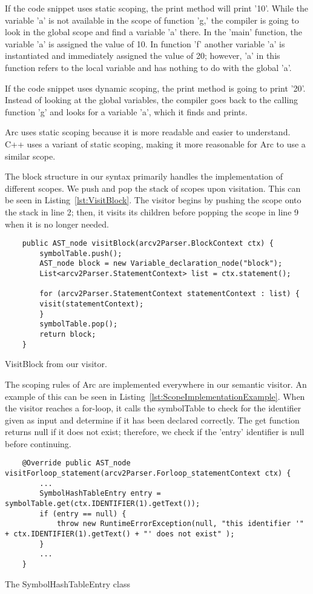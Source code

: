 If the code snippet uses static scoping, the print method will print '10'. While the variable 'a' is not available in the scope of function 'g,' the compiler is going to look in the global scope and find a variable 'a' there. In the 'main' function, the variable 'a' is assigned the value of 10. In function 'f' another variable 'a' is instantiated and immediately assigned the value of 20; however, 'a' in this function refers to the local variable and has nothing to do with the global 'a'.

If the code snippet uses dynamic scoping, the print method is going to print '20'. Instead of looking at the global variables, the compiler goes back to the calling function 'g' and looks for a variable 'a', which it finds and prints.

Arc uses static scoping because it is more readable and easier to understand. C++ uses a variant of static scoping, making it more reasonable for Arc to use a similar scope.

The block structure in our syntax primarily handles the implementation of different scopes. We push and pop the stack of scopes upon visitation. This can be seen in Listing~\ref{lst:VisitBlock}. The visitor begins by pushing the scope onto the stack in line 2; then, it visits its children before popping the scope in line 9 when it is no longer needed.


\begin{listing}[htb!]
    \begin{verbatim}
    public AST_node visitBlock(arcv2Parser.BlockContext ctx) {
        symbolTable.push();
        AST_node block = new Variable_declaration_node("block");
        List<arcv2Parser.StatementContext> list = ctx.statement();

        for (arcv2Parser.StatementContext statementContext : list) {
        visit(statementContext);   
        }
        symbolTable.pop();
        return block;
    }
    \end{verbatim}
    \caption{VisitBlock from our visitor.}
    \label{lst:VisitBlock}
\end{listing}


The scoping rules of Arc are implemented everywhere in our semantic visitor. An example of this can be seen in Listing~\ref{lst:ScopeImplementationExample}. When the visitor reaches a for-loop, it calls the symbolTable to check for the identifier given as input and determine if it has been declared correctly. The get function returns null if it does not exist; therefore, we check if the 'entry' identifier is null before continuing.


\begin{listing}[htb!]
    \begin{verbatim}
    @Override public AST_node visitForloop_statement(arcv2Parser.Forloop_statementContext ctx) { 
        ...
        SymbolHashTableEntry entry = symbolTable.get(ctx.IDENTIFIER(1).getText());
        if (entry == null) {
            throw new RuntimeErrorException(null, "this identifier '" + ctx.IDENTIFIER(1).getText() + "' does not exist" );
        }
        ...
    }
    \end{verbatim}
    \caption{The SymbolHashTableEntry class}
    \label{lst:ScopeImplementationExample}
\end{listing}
